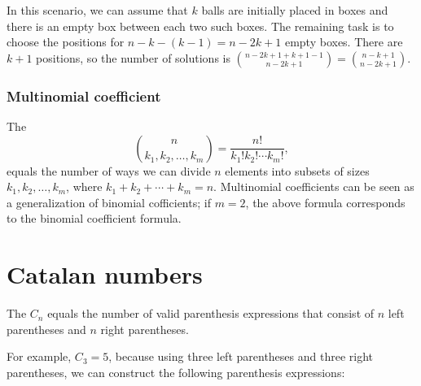 \begin{center}
\end{center}

In this scenario, we can assume that
$k$ balls are initially placed in boxes
and there is an empty box between each
two such boxes.
The remaining task is to choose the
positions for
$n-k-(k-1)=n-2k+1$ empty boxes.
There are $k+1$ positions,
so the number of solutions is
${n-2k+1+k+1-1 \choose n-2k+1} = {n-k+1 \choose n-2k+1}$.

\subsubsection{Multinomial coefficient}


The 
\[ {n \choose k_1,k_2,\ldots,k_m} = \frac{n!}{k_1! k_2! \cdots k_m!}, \]
equals the number of ways
we can divide $n$ elements into subsets
of sizes $k_1,k_2,\ldots,k_m$,
where $k_1+k_2+\cdots+k_m=n$.
Multinomial coefficients can be seen as a
generalization of binomial cofficients;
if $m=2$, the above formula
corresponds to the binomial coefficient formula.

\section{Catalan numbers}


The  $C_n$ equals the
number of valid
parenthesis expressions that consist of
$n$ left parentheses and $n$ right parentheses.

For example, $C_3=5$, because using three
left parentheses and three right parentheses,
we can construct the following parenthesis
expressions:

